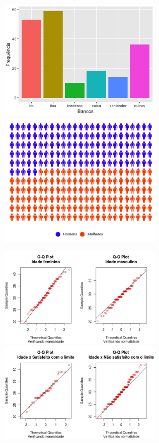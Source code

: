 \documentclass[]{article}
\begin{document}
\includegraphics[width=3.12500in]{Bancos.png}
\includegraphics[width=3.12500in]{pictograma.png}

\includegraphics[width=3.12500in]{QQ Plot idade genero.jpeg}
\includegraphics[width=3.12500in]{QQplot Idade x Lim.jpeg}
\end{document}
